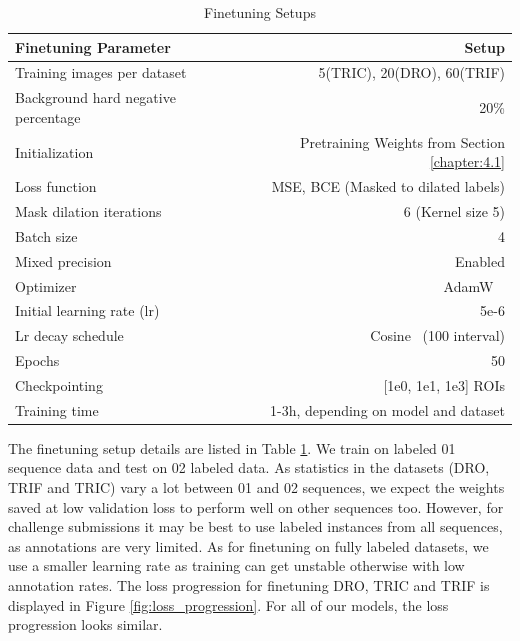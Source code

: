 \begin{table}[ht]
\centering
\caption{Finetuning Setups}
\label{tab:4.5}
\begin{tabular}{l r}
\hline\hline
\textbf{Finetuning Parameter} & \textbf{Setup} \\
\hline
Training images per dataset                   &  5(TRIC), 20(DRO), 60(TRIF)                              \\
Background hard negative percentage             &  20\%           \\
Initialization                                  &  Pretraining Weights from Section \ref{chapter:4.1}             \\
Loss function                                   &  MSE, BCE (Masked to dilated labels)                    \\
Mask dilation iterations                        &  6 (Kernel size 5) \\
Batch size                                      &  4                                \\
Mixed precision                                 &  Enabled  \\
Optimizer                                       &  AdamW \                   \\
Initial learning rate (lr)                      &  5e-6                 \\
Lr decay schedule                               &  Cosine \ (100 interval) \\
Epochs                                          &  50                               \\
Checkpointing                                   &  [1e0, 1e1, 1e3] ROIs                               \\
\midrule
Training time                                   &  1-3h, depending on model and dataset                       \\
\hline
\end{tabular}
\end{table}

The finetuning setup details are listed in Table \ref{tab:4.5}. We train on labeled 01 sequence data and test on 02 labeled data. As statistics in the datasets (DRO, TRIF and TRIC) vary a lot between 01 and 02 sequences, we expect the weights saved at low validation loss to perform well on other sequences too. However, for challenge submissions it may be best to use labeled instances from all sequences, as annotations are very limited. As for finetuning on fully labeled datasets, we use a smaller learning rate as training can get unstable otherwise with low annotation rates. The loss progression for finetuning DRO, TRIC and TRIF is displayed in Figure \ref{fig:loss_progression}. For all of our models, the loss progression looks similar. 

